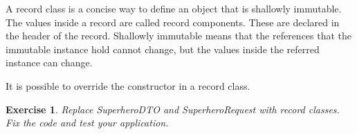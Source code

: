 \documentclass[a4paper, 12pt]{report}
\newenvironment{boxexercise}
{\begin{tcolorbox}
[enhanced jigsaw,breakable,pad at break*=1mm,
 colback=tsyellow!20,boxrule=0pt,frame hidden]}
{\end{tcolorbox}}
\newtheorem{envoefening}{\textbf{Exercise}}[chapter]
\newenvironment{oefening}
               {\begin{boxexercise}\begin{envoefening}}
               {\end{envoefening}\end{boxexercise}}
\begin{document}
A record class is a concise way to define an object that is shallowly immutable. The values inside a record are called record components. These are declared in the header of the record. Shallowly immutable means that the references that the immutable instance hold cannot change, but the values inside the referred instance can change.

It is possible to override the constructor in a record class.

\begin{oefening}
Replace SuperheroDTO and SuperheroRequest with record classes.  Fix the code and test your application.
\end{oefening}
  


\printbibliography
\end{document}
